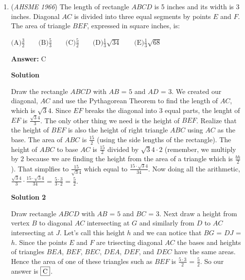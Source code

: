 \begin{enumerate}
 $\text{(A)} \ 9 \qquad \text{(B)} \ 10 \qquad \text{(C)} \ 14 \qquad \text{(D)} \ 15 \qquad \text{(E) infinite}$

 \textbf{Answer: }E



\textbf{Solution}

$\fbox{E}$



	\item (\textit{AHSME 1966}) The length of rectangle $ABCD$ is 5 inches and its width is 3 inches. Diagonal $AC$ is divided into three equal segments by points $E$ and $F$. The area of triangle $BEF$, expressed in square inches, is:


 $\text{(A)} \frac{3}{2} \qquad \text{(B)} \frac {5}{3} \qquad \text{(C)} \frac{5}{2} \qquad \text{(D)} \frac{1}{3}\sqrt{34} \qquad \text{(E)} \frac{1}{3}\sqrt{68}$

 \textbf{Answer: }C



\textbf{Solution}

Draw the rectangle $ABCD$ with $AB$ = $5$ and $AD$ = $3$. We created our diagonal, $AC$ and use the Pythagorean Theorem to find the length of $AC$, which is $\sqrt34$. Since $EF$ breaks the diagonal into $3$ equal parts, the lenght of $EF$ is $\frac {\sqrt34}{3}$. The only other thing we need is the height of $BEF$. Realize that the height of $BEF$ is also the height of right triangle $ABC$ using $AC$ as the base. The area of $ABC$ is $\frac{15}{2}$ (using the side lengths of the rectangle). The height of $ABC$ to base $AC$ is $\frac{15}{2}$ divided by $\sqrt34 \cdot 2$ (remember, we multiply by $2$ because we are finding the height from the area of a triangle which is $\frac{bh}{2}$). That simplfies to $\frac{15}{\sqrt34}$ which equal to $\frac{15 \cdot \sqrt34}{34}$. Now doing all the arithmetic, $\frac {\sqrt34}{3} \cdot \frac{15 \cdot \sqrt34}{34}$ = $\frac {5 \cdot 3}{3 \cdot 2}$ = $\frac {5}{2}$.

 



\textbf{Solution 2}

Draw rectangle $ABCD$ with $AB$ = $5$ and $BC$ = $3$. Next draw a height from vertex $B$ to diagonal $AC$ intersecting at $G$ and similarly from $D$ to $AC$ intersecting at $J$. Let's call this height $h$ and we can notice that $BG$ = $DJ$ = $h$. Since the points $E$ and $F$ are trisecting diagonal $AC$ the bases and heights of triangles $BEA$, $BEF$, $BEC$, $DEA$, $DEF$, and $DEC$ have the same areas. Hence the area of one of these triangles such as $BEF$ is $\frac{5 \cdot 3}{2}$ = $\frac {5}{2}$. So our answer is $\fbox{C}$.


\end{enumerate}
